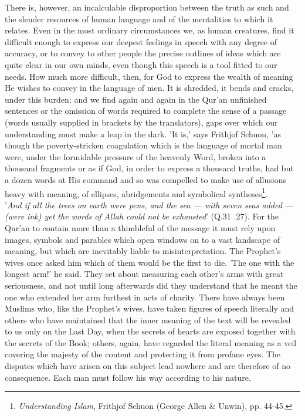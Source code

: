 \documentclass[11pt, b5paper, twoside]{book}
\begin{document}
There is, however, an incalculable disproportion between the truth as such and the slender resources 
of human language and of the mentalities to which it relates. Even in the most ordinary circumstances 
we, as human creatures, find it difficult enough to express our deepest feelings in speech with any 
degree of accuracy, or to convey to other people the precise outlines of ideas which are quite clear 
in our own minds, even though this speech is a tool fitted to our needs. How much more difficult, 
then, for God to express the wealth of meaning He wishes to convey in the language of men. It is 
shredded, it bends and cracks, under this burden; and we find again and again in the Qur'an 
unfinished sentences or the omission of words required to complete the sense of a passage (words 
usually supplied in brackets by the translators), gaps over which our understanding must make a leap 
in the dark. 'It is,' says Frithjof Schuon, 'as though the poverty-stricken coagulation which is the 
language of mortal man were, under the formidable pressure of the heavenly Word, broken into a 
thousand fragments or as if God, in order to express a thousand truths, had but a dozen words at His 
command and so was compelled to make use of allusions heavy with meaning, of ellipses, abridgements 
and symbolical syntheses\footnote{\emph{Understanding Islam}, Frithjof Schuon (George Allen \& Unwin), pp. 44-45.}.\\

'\emph{And if all the trees on earth were pens, and the sea --- with seven seas added --- (were ink) yet the words of Allah could not be exhausted}' (Q.31 .27). For the Qur'an to contain more than a thimbleful of the message it must rely upon images, symbols and parables which open windows on to a vast landscape of meaning, but which are inevitably liable to misinterpretation. The Prophet's wives once asked him which of them would be the first to die. 'The one with the longest arm!' he said. They set about 
measuring each other's arms with great seriousness, and not until long afterwards did they understand 
that he meant the one who extended her arm furthest in acts of charity. There have always been 
Muslims who, like the Prophet's wives, have taken figures of speech literally and others who have 
maintained that the inner meaning of the text will be revealed to us only on the Last Day, when the 
secrets of hearts are exposed together with the secrets of the Book; others, again, have regarded the 
literal meaning as a veil covering the majesty of the content and protecting it from profane eyes. 
The disputes which have arisen on this subject lead nowhere and are therefore of no consequence. Each 
man must follow his way according to his nature. \\
\end{document}
